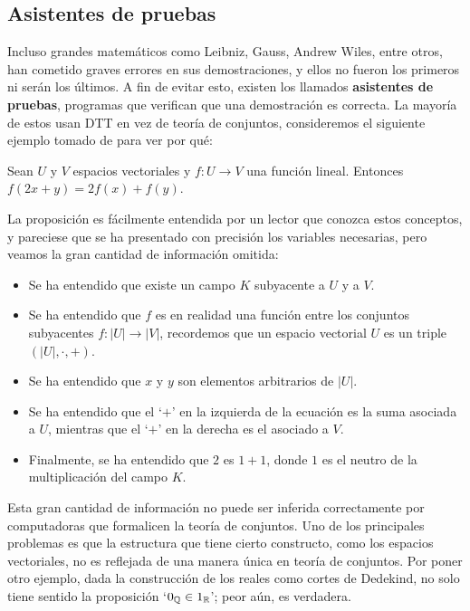 \documentclass[../main.tex]{subfiles}
\begin{document}
\subsection*{Asistentes de pruebas}

Incluso grandes matemáticos como Leibniz, Gauss, Andrew Wiles, entre otros, han cometido graves errores en sus demostraciones, y ellos no fueron los primeros ni ser\'an los \'ultimos.
A fin de evitar esto, existen los llamados \textbf{asistentes de pruebas}, programas que verifican que una demostración es correcta.
La mayor\'ia de estos usan DTT en vez de teor\'ia de conjuntos, consideremos el siguiente ejemplo tomado de \cite{376973} para ver por qu\'e:

\begin{proposition}
    Sean $U$ y $V$ espacios vectoriales y $f:U \to V$ una función lineal. Entonces $f(2x+y)=2f(x)+f(y)$.
\end{proposition}

La proposici\'on es f\'acilmente entendida por un lector que conozca estos conceptos, y pareciese que se ha presentado con precisión los variables necesarias, pero veamos la gran cantidad de informaci\'on omitida:

\begin{itemize}
    \item Se ha entendido que existe un campo $K$ subyacente a $U$ y a $V$.
    \item Se ha entendido que $f$ es en realidad una función entre los conjuntos subyacentes $f: |U| \to |V|$, recordemos que un espacio vectorial $U$ es un triple $(|U|,\cdot,+)$.
    \item Se ha entendido que $x$ y $y$ son elementos arbitrarios de $|U|$.
    \item Se ha entendido que el `$+$' en la izquierda de la ecuaci\'on es la suma asociada a $U$, mientras que el `$+$' en la derecha es el asociado a $V$.
    \item Finalmente, se ha entendido que $2$ es $1+1$, donde $1$ es el neutro de la multiplicaci\'on del campo $K$.
\end{itemize}

Esta gran cantidad de informaci\'on no puede ser inferida correctamente por computadoras que formalicen la teor\'ia de conjuntos.
Uno de los principales problemas es que la estructura que tiene cierto constructo, como los espacios vectoriales, no es reflejada de una manera \'unica en teor\'ia de conjuntos.
Por poner otro ejemplo, dada la construcci\'on de los reales como cortes de Dedekind, no solo tiene sentido la proposici\'on `$0_\mathbb{Q} \in 1_\mathbb{R}$'; peor a\'un, es verdadera.
\end{document}
